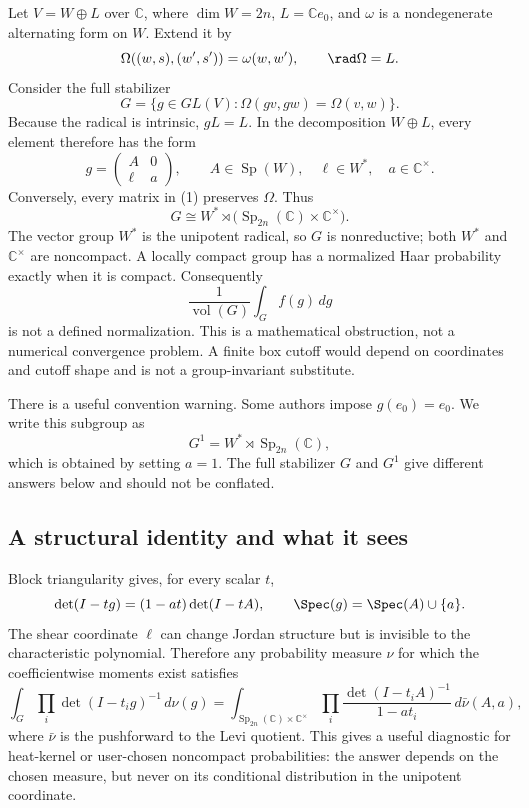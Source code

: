 \documentclass[10pt]{article}
\newcommand{\Sp}{\operatorname{Sp}}
\begin{document}
Let $V=W\oplus L$ over $\mathbb C$, where $\dim W=2n$, $L=\mathbb C e_0$,
and $\omega$ is a nondegenerate alternating form on $W$. Extend it by
\[
 \Omega((w,s),(w',s'))=\omega(w,w'),\qquad \rad\Omega=L.
\]
Consider the full stabilizer
\[
 G=\{g\in GL(V):\Omega(gv,gw)=\Omega(v,w)\}.
\]
Because the radical is intrinsic, $gL=L$. In the decomposition $W\oplus L$,
every element therefore has the form
\begin{equation}
 g=\begin{pmatrix}A&0\\ \ell&a\end{pmatrix},\qquad
 A\in\Sp(W),\quad \ell\in W^*,\quad a\in\mathbb C^\times.
\end{equation}
Conversely, every matrix in (1) preserves $\Omega$. Thus
\begin{equation}
 G\cong W^*\rtimes\bigl(\Sp_{2n}(\mathbb C)\times\mathbb C^\times\bigr).
\end{equation}
The vector group $W^*$ is the unipotent radical, so $G$ is nonreductive; both
$W^*$ and $\mathbb C^\times$ are noncompact. A locally compact group has a
normalized Haar probability exactly when it is compact. Consequently
\[
 \frac{1}{\operatorname{vol}(G)}\int_G f(g)\,dg
\]
is not a defined normalization. This is a mathematical obstruction, not a
numerical convergence problem. A finite box cutoff would depend on coordinates
and cutoff shape and is not a group-invariant substitute.

There is a useful convention warning. Some authors impose $g(e_0)=e_0$. We
write this subgroup as
\begin{equation}
 G^1=W^*\rtimes\Sp_{2n}(\mathbb C),
\end{equation}
which is obtained by setting $a=1$. The full stabilizer $G$ and $G^1$ give
different answers below and should not be conflated.

\subsection{A structural identity and what it sees}

Block triangularity gives, for every scalar $t$,
\begin{equation}
 \det(I-tg)=(1-at)\det(I-tA),\qquad
 \Spec(g)=\Spec(A)\cup\{a\}.
\end{equation}
The shear coordinate $\ell$ can change Jordan structure but is invisible to
the characteristic polynomial. Therefore any probability measure $\nu$ for
which the coefficientwise moments exist satisfies
\begin{equation}
 \int_G\prod_i\det(I-t_i g)^{-1}\,d\nu(g)
 =\int_{\Sp_{2n}(\mathbb C)\times\mathbb C^\times}
 \prod_i\frac{\det(I-t_iA)^{-1}}{1-at_i}\,d\bar\nu(A,a),
\end{equation}
where $\bar\nu$ is the pushforward to the Levi quotient. This gives a useful
diagnostic for heat-kernel or user-chosen noncompact probabilities: the answer
depends on the chosen measure, but never on its conditional distribution in
the unipotent coordinate.
\end{document}
